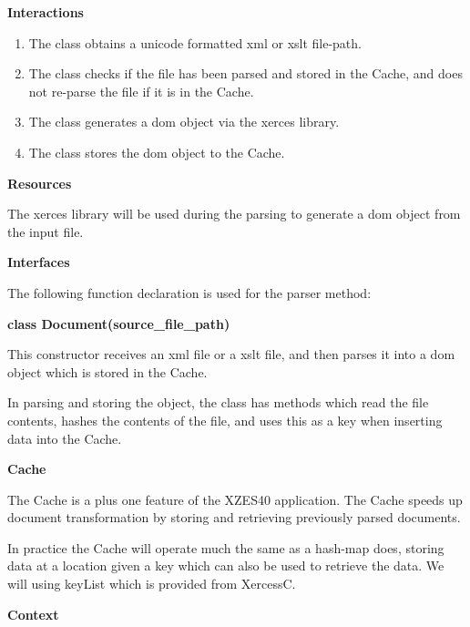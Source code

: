 \textbf{Interactions}

\begin{enumerate}
  \item The class obtains a \gls{unicode} formatted \gls{xml} or \gls{xslt} file-path.
  \item The class checks if the file has been parsed and stored in the Cache, and does not re-parse the file if it is in the Cache.
  \item The class generates a \gls{dom} object via the \gls{xerces} library.
  \item The class stores the \gls{dom} object to the Cache.
\end{enumerate}

\textbf{Resources}

The \gls{xerces} library will be used during the parsing to generate a \gls{dom} object from the input file.

\textbf{Interfaces}

The following function declaration is used for the parser method:

\textbf{class Document(source\_file\_path)}

This constructor receives an \gls{xml} file or a \gls{xslt} file, and then parses it into a \gls{dom} object which is stored in the Cache.

In parsing and storing the object, the class has methods which read the file contents, hashes the contents of the file, and uses this as a key when inserting data into the Cache.

\textbf{Cache}
\label{cache}

The Cache is a plus one feature of the XZES40 application.
The Cache speeds up document transformation by storing and retrieving previously parsed documents.

In practice the Cache will operate much the same as a \gls{hash-map} does, storing data at a location given a key which can also be used to retrieve the data.
We will using keyList which is provided from XercessC.

\textbf{Context}

